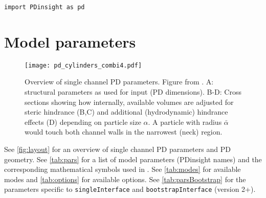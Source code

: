 \documentclass[a4paper,12pt]{article}
\newcommand{\SEL}{\bar{\alpha}}
\begin{document}
\texttt{import PDinsight as pd}

\section{Model parameters}

\begin{figure}
\texttt{[image: pd\_cylinders\_combi4.pdf]}
\caption{Overview of single channel PD parameters. Figure from \citet{Deinum.e19}. A: structural parameters as used for input (PD dimensions). B-D: Cross sections showing how internally, available volumes are adjusted for steric hindrance (B,C) and additional (hydrodynamic) hindrance effects (D) depending on particle size $\alpha$. A particle with radius $\SEL$ would touch both channel walls in the narrowest (neck) region.}
\label{fig:layout}
\end{figure}

See \autoref{fig:layout} for an overview of single channel PD parameters and PD geometry. See \autoref{tab:pars} for a list of model parameters (PDinsight names) and the corresponding mathematical symbols used in \citet{Deinum.e19}. See \autoref{tab:modes} for available modes and \autoref{tab:options} for available options. See \autoref{tab:parsBootstrap} for the parameters specific to \texttt{singleInterface} and \texttt{bootstrapInterface} (version 2+). 
\end{document}
